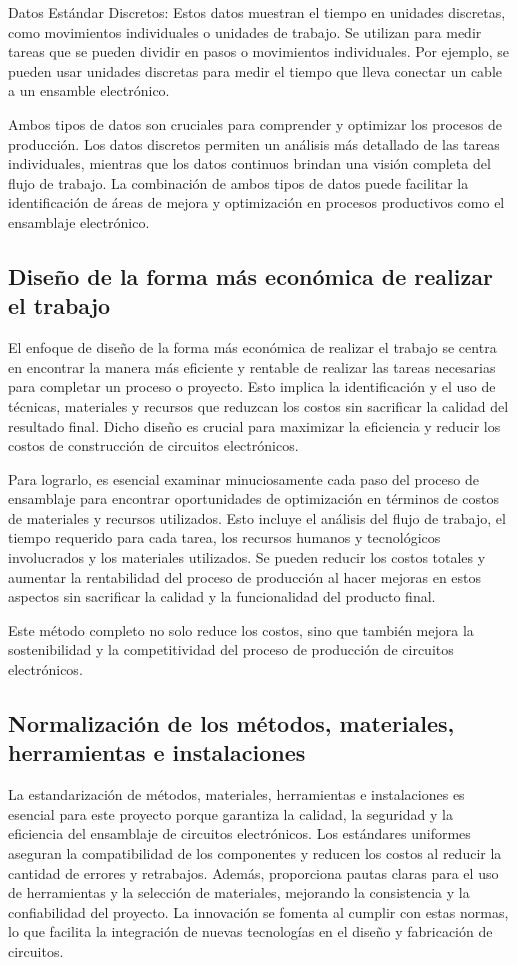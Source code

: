 Datos Estándar Discretos: Estos datos muestran el tiempo en unidades discretas, como movimientos individuales o unidades de trabajo. Se utilizan para medir tareas que se pueden dividir en pasos o movimientos individuales. Por ejemplo, se pueden usar unidades discretas para medir el tiempo que lleva conectar un cable a un ensamble electrónico.

Ambos tipos de datos son cruciales para comprender y optimizar los procesos de producción. Los datos discretos permiten un análisis más detallado de las tareas individuales, mientras que los datos continuos brindan una visión completa del flujo de trabajo. La combinación de ambos tipos de datos puede facilitar la identificación de áreas de mejora y optimización en procesos productivos como el ensamblaje electrónico.
% 
% 

% 
% 
\subsection{Diseño de la forma más económica de realizar el trabajo}
% 
El enfoque de diseño de la forma más económica de realizar el trabajo se centra en encontrar la manera más eficiente y rentable de realizar las tareas necesarias para completar un proceso o proyecto. Esto implica la identificación y el uso de técnicas, materiales y recursos que reduzcan los costos sin sacrificar la calidad del resultado final. Dicho diseño es crucial para maximizar la eficiencia y reducir los costos de construcción de circuitos electrónicos.

Para lograrlo, es esencial examinar minuciosamente cada paso del proceso de ensamblaje para encontrar oportunidades de optimización en términos de costos de materiales y recursos utilizados. Esto incluye el análisis del flujo de trabajo, el tiempo requerido para cada tarea, los recursos humanos y tecnológicos involucrados y los materiales utilizados. Se pueden reducir los costos totales y aumentar la rentabilidad del proceso de producción al hacer mejoras en estos aspectos sin sacrificar la calidad y la funcionalidad del producto final.

Este método completo no solo reduce los costos, sino que también mejora la sostenibilidad y la competitividad del proceso de producción de circuitos electrónicos.
% 
\subsection{Normalización de los métodos, materiales, herramientas e instalaciones}
% 
La estandarización de métodos, materiales, herramientas e instalaciones es esencial para este proyecto porque garantiza la calidad, la seguridad y la eficiencia del ensamblaje de circuitos electrónicos. Los estándares uniformes aseguran la compatibilidad de los componentes y reducen los costos al reducir la cantidad de errores y retrabajos. Además, proporciona pautas claras para el uso de herramientas y la selección de materiales, mejorando la consistencia y la confiabilidad del proyecto. La innovación se fomenta al cumplir con estas normas, lo que facilita la integración de nuevas tecnologías en el diseño y fabricación de circuitos.

